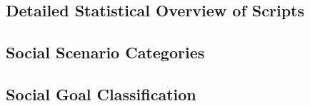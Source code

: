 \subsection{Detailed Statistical Overview of Scripts}\label{app:detailed_data_info}


\subsection{Social Scenario Categories}\label{app:social scenario}


\subsection{Social Goal Classification}\label{app:social_goal}
